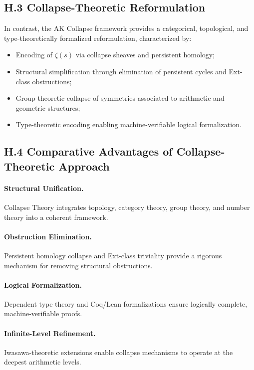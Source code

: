 \documentclass[11pt]{article}
\begin{document}
\subsection*{H.3 Collapse-Theoretic Reformulation}

In contrast, the AK Collapse framework provides a categorical, topological, and type-theoretically formalized reformulation, characterized by:

\begin{itemize}
    \item Encoding of $\zeta(s)$ via collapse sheaves and persistent homology;
    \item Structural simplification through elimination of persistent cycles and Ext-class obstructions;
    \item Group-theoretic collapse of symmetries associated to arithmetic and geometric structures;
    \item Type-theoretic encoding enabling machine-verifiable logical formalization.
\end{itemize}

\subsection*{H.4 Comparative Advantages of Collapse-Theoretic Approach}

\paragraph{Structural Unification.}  
Collapse Theory integrates topology, category theory, group theory, and number theory into a coherent framework.

\paragraph{Obstruction Elimination.}  
Persistent homology collapse and Ext-class triviality provide a rigorous mechanism for removing structural obstructions.

\paragraph{Logical Formalization.}  
Dependent type theory and Coq/Lean formalizations ensure logically complete, machine-verifiable proofs.

\paragraph{Infinite-Level Refinement.}  
Iwasawa-theoretic extensions enable collapse mechanisms to operate at the deepest arithmetic levels.
\end{document}
